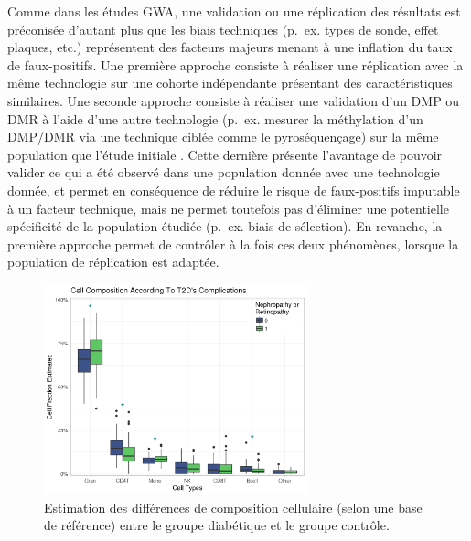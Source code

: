 \documentclass[11pt,a4paper,notrimn]{krantz}
\theoremstyle{definition}
\theoremstyle{definition}
\theoremstyle{remark}
\begin{document}
Comme dans les études GWA, une validation ou une réplication des
résultats est préconisée d'autant plus que les biais techniques (p.~ex.
types de sonde, effet plaques, etc.) représentent des facteurs majeurs
menant à une inflation du taux de faux-positifs. Une première approche
consiste à réaliser une réplication avec la même technologie sur une
cohorte indépendante présentant des caractéristiques similaires. Une
seconde approche consiste à réaliser une validation d'un DMP ou DMR à
l'aide d'une autre technologie (p.~ex. mesurer la méthylation d'un
DMP/DMR via une technique ciblée comme le pyroséquençage) sur la même
population que l'étude initiale \citep{kurdyukov_dna_2016}. Cette
dernière présente l'avantage de pouvoir valider ce qui a été observé
dans une population donnée avec une technologie donnée, et permet en
conséquence de réduire le risque de faux-positifs imputable à un facteur
technique, mais ne permet toutefois pas d'éliminer une potentielle
spécificité de la population étudiée (p.~ex. biais de sélection). En
revanche, la première approche permet de contrôler à la fois ces deux
phénomènes, lorsque la population de réplication est adaptée.





\begin{figure}[!htb]

{\centering \includegraphics[width=3in,height=2.4in]{FiguresTables/Figure8} 

}

\caption{Estimation des différences de composition cellulaire
(selon une base de référence) entre le groupe diabétique et le groupe
contrôle.}\label{fig:compcell}
\end{figure}
\end{document}
